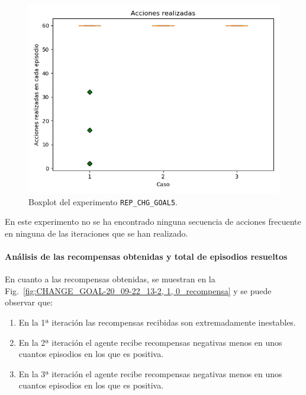 \begin{figure}
    \centering
    \includegraphics[scale=0.4]{cap5_experimentacion/images/CHANGE_GOAL-20_09-22_13-2, 1, 0_boxplot.png}
    \caption{Boxplot del experimento \texttt{REP\_CHG\_GOAL5}.}
    \label{fig:CHANGE_GOAL-20_09-22_13-2, 1, 0_boxplot}
\end{figure}

En este experimento no se ha encontrado ninguna secuencia de acciones frecuente en ninguna de las iteraciones que se han realizado. 

\paragraph{Análisis de las recompensas obtenidas y total de episodios resueltos} 

En cuanto a las recompensas obtenidas, se muestran en la Fig.~\ref{fig:CHANGE_GOAL-20_09-22_13-2, 1, 0_recompensa} y se puede observar que: 
\begin{enumerate}
    \item En la 1ª iteración las recompensas recibidas son extremadamente inestables.
    \item En la 2ª iteración el agente recibe recompensas negativas menos en unos cuantos episodios en los que es positiva. 
    \item En la 3ª iteración el agente recibe recompensas negativas menos en unos cuantos episodios en los que es positiva. 
\end{enumerate}

